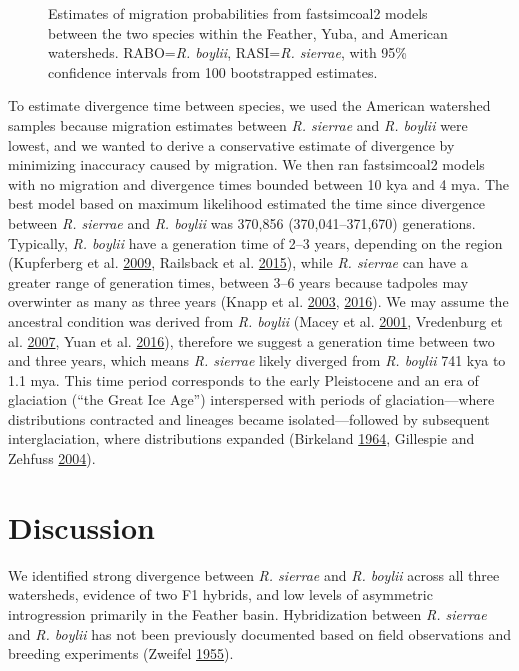 \documentclass[proquest,12pt,final]{ucthesis-CA2012} %
\begin{document}
\begin{ucmainmatter}
\begin{figure}
\caption{Estimates of migration probabilities from fastsimcoal2
models between the two species within the Feather, Yuba, and American
watersheds. RABO=\emph{R. boylii}, RASI=\emph{R. sierrae}, with 95\%
confidence intervals from 100 bootstrapped estimates.}\label{fig:CH2F6fsc}
\end{figure}
To estimate divergence time between species, we used the American
watershed samples because migration estimates between \emph{R. sierrae}
and \emph{R. boylii} were lowest, and we wanted to derive a conservative
estimate of divergence by minimizing inaccuracy caused by migration. We
then ran fastsimcoal2 models with no migration and divergence times
bounded between 10 kya and 4 mya. The best model based on maximum
likelihood estimated the time since divergence between \emph{R. sierrae}
and \emph{R. boylii} was 370,856 (370,041--371,670) generations.
Typically, \emph{R. boylii} have a generation time of 2--3 years,
depending on the region (Kupferberg et al.
\protect\hyperlink{ref-kupferberg_pulsed_2009}{2009}, Railsback et al.
\protect\hyperlink{ref-railsback_modeling_2015}{2015}), while \emph{R.
sierrae} can have a greater range of generation times, between 3--6
years because tadpoles may overwinter as many as three years (Knapp et
al. \protect\hyperlink{ref-knapp_developing_2003}{2003},
\protect\hyperlink{ref-knapp_large-scale_2016}{2016}). We may assume the
ancestral condition was derived from \emph{R. boylii} (Macey et al.
\protect\hyperlink{ref-macey_molecular_2001}{2001}, Vredenburg et al.
\protect\hyperlink{ref-vredenburg_concordant_2007}{2007}, Yuan et al.
\protect\hyperlink{ref-yuan_spatiotemporal_2016}{2016}), therefore we
suggest a generation time between two and three years, which means
\emph{R. sierrae} likely diverged from \emph{R. boylii} 741 kya to 1.1
mya. This time period corresponds to the early Pleistocene and an era of
glaciation (``the Great Ice Age'') interspersed with periods of
glaciation---where distributions contracted and lineages became
isolated---followed by subsequent interglaciation, where distributions
expanded (Birkeland
\protect\hyperlink{ref-birkeland_pleistocene_1964}{1964}, Gillespie and
Zehfuss \protect\hyperlink{ref-gillespie_glaciations_2004}{2004}).

\hypertarget{discussion-1}{%
\section{Discussion}\label{discussion-1}}

We identified strong divergence between \emph{R. sierrae} and \emph{R.
boylii} across all three watersheds, evidence of two F1 hybrids, and low
levels of asymmetric introgression primarily in the Feather basin.
Hybridization between \emph{R. sierrae} and \emph{R. boylii} has not
been previously documented based on field observations and breeding
experiments (Zweifel
\protect\hyperlink{ref-zweifel_ecology_1955}{1955}).


\end{ucmainmatter}
\end{document}
